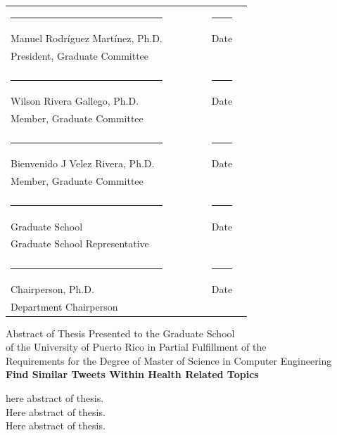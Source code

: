 \documentclass[12pt]{report}
\begin{document}
\begin{titlepage}
\begin{tabular}{l c c c c c r}
			\rule{2.5in}{.1pt} & & & &  &\rule{2in}{.1pt}\\
			Manuel Rodr\'iguez Mart\'inez, Ph.D. & & & &  &Date\\
			President, Graduate Committee\\
			\vspace{.3cm}\\
			\rule{2.5in}{.1pt}& & & &  &\rule{2in}{.1pt}\\
			Wilson Rivera Gallego, Ph.D. & & & &  &Date\\
			Member, Graduate Committee\\
			\vspace{.3cm}\\
			\rule{2.5in}{.1pt} & & & &  &\rule{2in}{.1pt}\\
			Bienvenido J Velez Rivera, Ph.D. & & & &  &Date\\
			Member, Graduate Committee\\
			\vspace{.45cm}\\
			\rule{2.5in}{.1pt} & & & &  &\rule{2in}{.1pt}\\
			Graduate School & & & &  &Date\\
			Graduate School Representative\\
			\vspace{.45cm}\\
			\rule{2.5in}{.1pt} & & & &  &\rule{2in}{.1pt}\\
			Chairperson, Ph.D. & & & &  &Date\\
			Department Chairperson \\
		\end{tabular}
	\end{titlepage}
	
	\setcounter{page}{2}
	
	\begin{center}
		\doublespacing
		Abstract of Thesis Presented to the Graduate School\\
		of the University of Puerto Rico in Partial Fulfillment of the\\
		Requirements for the Degree of Master of Science in Computer Engineering\\
		\vspace{.1cm}
		\large\textbf {Find Similar Tweets Within Health Related Topics}
	\end{center}
	\doublespacing
	here abstract of thesis.\\
	Here abstract of thesis.\\	
	Here abstract of thesis.\\
	\par
	\clearpage
	
\end{document}
